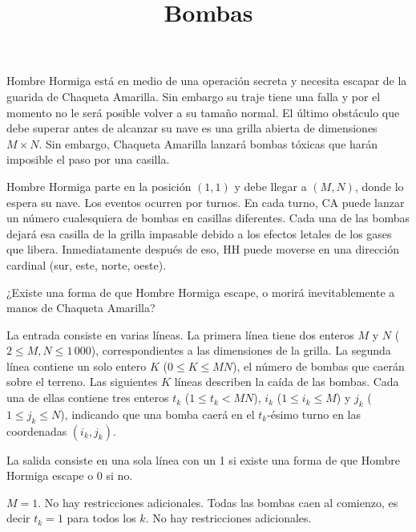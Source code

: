 \documentclass{oci}
\title{Bombas}
\begin{document}
\begin{problemDescription}
Hombre Hormiga está en medio de una operación secreta y necesita escapar de la guarida de Chaqueta Amarilla.
Sin embargo su traje tiene una falla y por el momento no le será posible volver a su tamaño normal.
El último obstáculo que debe superar antes de alcanzar su nave es una grilla abierta de dimensiones $M \times N$.
Sin embargo, Chaqueta Amarilla lanzará bombas tóxicas que harán imposible el paso por una casilla.

Hombre Hormiga parte en la posición $(1,1)$ y debe llegar a $(M,N)$, donde lo espera su nave.
Los eventos ocurren por turnos.
En cada turno, CA puede lanzar un número cualesquiera de bombas en casillas diferentes. Cada una de las bombas dejará esa casilla de la grilla impasable debido a los efectos letales de los gases que libera.
Inmediatamente después de eso, HH puede moverse en una dirección cardinal (sur, este, norte, oeste).

¿Existe una forma de que Hombre Hormiga escape, o morirá inevitablemente a manos de Chaqueta Amarilla?
\end{problemDescription}

\begin{inputDescription}
La entrada consiste en varias líneas.
La primera línea tiene dos enteros $M$ y $N$ ($2 \le M, N \le 1\,000$), correspondientes a las dimensiones de la grilla.
La segunda línea contiene un solo entero $K$ ($0 \le K \le MN$), el número de bombas que caerán sobre el terreno.
Las siguientes $K$ líneas describen la caída de las bombas.
Cada una de ellas contiene tres enteros $t_k$ ($1 \le t_k < MN$), $i_k$ ($1 \le i_k \le M$) y $j_k$ ($1 \le j_k \le N$), indicando que una bomba caerá en el $t_k$-ésimo turno en las coordenadas $(i_k, j_k)$.
\end{inputDescription}

\begin{outputDescription}
La salida consiste en una sola línea con un 1 si existe una forma de que Hombre Hormiga escape o 0 si no.
\end{outputDescription}

\begin{scoreDescription}
  $M = 1$. No hay restricciones adicionales.
  Todas las bombas caen al comienzo, es decir $t_k = 1$ para todos los $k$.
  No hay restricciones adicionales.
\end{scoreDescription}

\begin{sampleDescription}
\end{sampleDescription}
\end{document}
